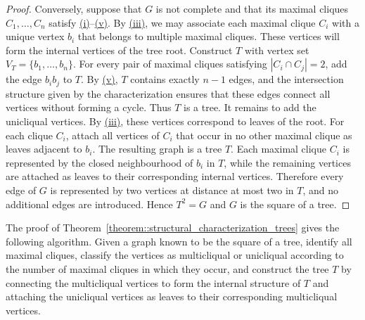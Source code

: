 \documentclass[11pt]{report}
\begin{document}
\begin{proof}
  Conversely, suppose that $G$ is not complete and that its maximal cliques $C_1,\ldots,C_n$ satisfy \hyperref[characterization::1]{(i)}--\hyperref[characterization::5]{(v)}. By \hyperref[characterization::3]{(iii)}, we may associate each maximal clique $C_i$ with a unique vertex $b_i$ that belongs to multiple maximal cliques. These vertices will form the internal vertices of the tree root. Construct $T$ with vertex set $V_T=\{b_1,\ldots,b_n\}$. For every pair of maximal cliques satisfying $|C_i\cap C_j|=2$, 
  add the edge $b_i b_j$ to $T$. By \hyperref[characterization::5]{(v)}, $T$ contains exactly $n-1$ edges, and the intersection structure given by the characterization ensures that these edges connect all vertices without forming a cycle. Thus $T$ is a tree. It remains to add the unicliqual vertices. By \hyperref[characterization::3]{(iii)}, these vertices correspond to leaves of the root. For each clique $C_i$, attach all vertices of $C_i$ that occur in no other maximal clique as leaves adjacent to $b_i$. The resulting graph is a tree $T$. Each maximal clique $C_i$ is represented by the closed neighbourhood of $b_i$ in $T$, while the remaining vertices are attached as leaves to their corresponding internal vertices. Therefore every edge of $G$ is represented by two vertices at distance at most two in $T$, and no additional edges are introduced. Hence $T^2=G$ and $G$ is the square of a tree.
\end{proof}

The proof of Theorem~\eqref{theorem::structural_characterization_trees} gives the following algorithm. Given a graph known to be the square of a tree, identify all maximal cliques, classify the vertices as multicliqual or unicliqual according to the number of maximal cliques in which they occur, and construct the tree $T$ by connecting the multicliqual vertices to form the internal structure of $T$ and attaching the unicliqual vertices as leaves to their corresponding multicliqual vertices.
\end{document}
